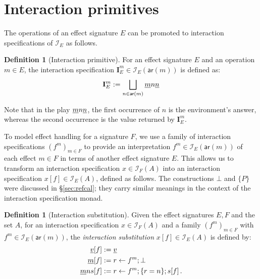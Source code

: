 \documentclass[11pt,oneside,draft]{book}
\theoremstyle{definition}
\newtheorem{definition}[theorem]{Definition}
\newcommand{\kw}[1]{\ensuremath{ \mathsf{#1} }}
\newcommand{\ul}[1]{%
  \underline{\smash{#1}}
}
\begin{document}

\section{Interaction primitives} %

The operations of an effect signature $E$
can be promoted to interaction specifications of $\mathcal{I}_E$
as follows.

\begin{definition}[Interaction primitive]
For an effect signature $E$ and
an operation $m \in E$,
the interaction specification
$\mathbf{I}_E^m \in \mathcal{I}_E(\kw{ar}(m))$
is defined as:
\[
  \mathbf{I}_E^m :=
    \bigsqcup_{n \in \kw{ar}(m)} \ul{m} n \ul{n}
\]
\end{definition}
Note that in the play $\ul{m} n \ul{n}$,
the first occurrence of $n$ is the environment's answer,
whereas the second occurrence is the value returned by $\mathbf{I}_E^m$.

To model effect handling for a signature $F$,
we use a family of interaction specifications
$(f^m)_{m \in F}$
to provide an interpretation $f^m \in \mathcal{I}_E(\kw{ar}(m))$
of each effect $m \in F$
in terms of another effect signature $E$.
This allows us to transform an interaction specification
$x \in \mathcal{I}_F(A)$
into an interaction specification
$x[f] \in \mathcal{I}_E(A)$,
defined as follows.
The constructions $\bot$ and $\{P\}$ were discussed in \S\ref{sec:refcal};
they carry similar meanings in the context of the
interaction specification monad.

\begin{definition}[Interaction substitution]
Given the effect signatures $E, F$ and the set $A$,
for an interaction specification $x \in \mathcal{I}_F(A)$
and a family $(f^m)_{m \in F}$ with $f^m \in \mathcal{I}_E(\kw{ar}(m))$,
the \emph{interaction substitution} $x[f] \in \mathcal{I}_E(A)$
is defined by:
\begin{align*}
  \ul{v}[f] &:= \ul{v} \\
  \ul{m}[f] &:= r \leftarrow f^m ; \bot \\
  \ul{m}ns[f] &:= r \leftarrow f^m ; \{r = n\} ; s[f] \,.
\end{align*}
\end{definition}

\end{document}
